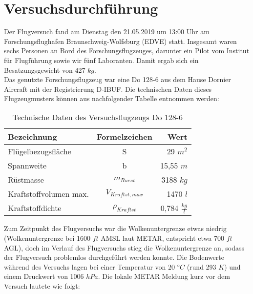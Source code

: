 \chapter{Versuchsdurchführung}
\label{chapter:versuch}
Der Flugversuch fand am  Dienstag den 21.05.2019 um 13:00 Uhr am Forschungsflughafen Braunschweig-Wolfsburg (EDVE) statt. Insgesamt waren sechs Personen an Bord des Forschungsflugzeuges, darunter ein Pilot vom Institut für Flugführung sowie wir fünf Laboranten. Damit ergab sich ein Besatzungsgewicht von 427 $kg$.\\
Das genutzte Forschungsflugzeug war eine Do 128-6 aus dem Hause Dornier Aircraft mit der Registrierung D-IBUF. Die technischen Daten dieses Flugzeugmusters können aus nachfolgender Tabelle entnommen werden:\\

\begin{table}[h]
	\centering
	\begin{tabular}{|l|c|r|}
		\hline
		\textbf{Bezeichnung}         	& \textbf{Formelzeichen} & \textbf{Wert}           		\\ \hline
		Flügelbezugsfläche           	& S                      & 29 $m^2$ 					\\ \hline
		Spannweite                   	& b                      & 15,55 $m$                 	\\ \hline
		Rüstmasse                    	& $m_{Ruest}$             & 3188 $kg$                 	\\ \hline
		Kraftstoffvolumen max. 			& $V_{Kraftst,max}$      & 1470 $l$            			\\ \hline
		Kraftstoffdichte             	& $\rho_{Kraftst}$       & 0,784 $\frac{kg}{l}$      	\\ \hline
	\end{tabular}
	\caption{Technische Daten des Versuchsflugzeugs Do 128-6}
\end{table}
\vspace{0.3cm}

\noindent Zum Zeitpunkt des Flugversuchs war die Wolkenuntergrenze etwas niedrig (Wolkenuntergrenze bei 1600 $ft$ AMSL laut METAR, entspricht etwa 700 $ft$ AGL), doch im Verlauf des Flugversuchs stieg die Wolkenuntergrenze an, sodass der Flugversuch problemlos durchgeführt werden konnte. Die Bodenwerte während des Versuchs lagen bei einer Temperatur von 20 $°C$ (rund 293 $K$) und einem Druckwert von 1006 $hPa$. Die lokale METAR Meldung kurz vor dem Versuch lautete wie folgt:\\\\

